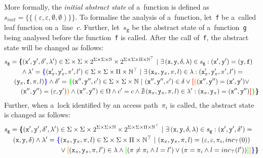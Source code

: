 More formally, the \emph{initial abstract state} of a~function is defined as $ s_{init} = \{\{(\varepsilon, \varepsilon, \emptyset, \emptyset)\}\} $. To formalise the analysis of a~function, let~\texttt{f} be a~called leaf function on a~line~$ c $. Further, let~$ s_\mathtt{g} $ be the abstract state of a~function~\texttt{g} being analysed before the function~\texttt{f} is called. After the call of~\texttt{f}, the abstract state will be changed as follows:
$$
\begin{multlined}
    s_\mathtt{g} = \bb{\{}(\mathtt{x}^\prime, \mathtt{y}^\prime, \delta^\prime, \lambda^\prime) \in \Sigma \times \Sigma \times 2^{\Sigma \times \Sigma \times \mathbb{N}} \times 2^{\Sigma \times \Sigma \times \Pi \times \mathbb{N}^\top}\ | \ \exists\,(\mathtt{x}, \mathtt{y}, \delta, \lambda) \in s_\mathtt{g} : (\mathtt{x}^\prime, \mathtt{y}^\prime) = (\mathtt{y}, \mathtt{f}) \\
%
    \wedge \lambda^\prime = \bA{\{}(\mathtt{x}_\pi^\prime, \mathtt{y}_\pi^\prime, \pi^\prime, l^\prime) \in \Sigma \times \Sigma \times \Pi \times \mathbb{N}^\top\  |\ \exists\,(\mathtt{x}_\pi, \mathtt{y}_\pi, \pi, l) \in \lambda : (\mathtt{x}_\pi^\prime, \mathtt{y}_\pi^\prime, \pi^\prime, l^\prime) = \\
%
    (\mathtt{y}_\pi, \mathtt{f}, \pi, l)\bA{\}} \wedge \delta^\prime = \bD{\{}(\mathtt{x}^{\prime\prime}, \mathtt{y}^{\prime\prime}, c^\prime) \in \Sigma \times \Sigma \times \mathbb{N}\ |\ (\mathtt{x}^{\prime\prime}, \mathtt{y}^{\prime\prime}, c^\prime) \in \delta \vee \bC{[}\bB{(}(\mathtt{x}^{\prime\prime}, \mathtt{y}^{\prime\prime}) = (\mathtt{x}^\prime, \mathtt{y}^\prime) \vee \\
%
    (\mathtt{x}^{\prime\prime}, \mathtt{y}^{\prime\prime}) = (\varepsilon, \mathtt{y}^\prime)\bB{)} \wedge (\mathtt{x}^{\prime\prime}, \mathtt{y}^{\prime\prime}) \in \Omega \wedge c^\prime = c \wedge \nexists\,(\mathtt{x}_\pi, \mathtt{y}_\pi, \pi, l) \in \lambda^\prime : (\mathtt{x}_\pi, \mathtt{y}_\pi) = (\mathtt{x}^{\prime\prime}, \mathtt{y}^{\prime\prime})%
%
    \bC{]}\bD{\}}\bb{\}}
\end{multlined}
$$
Further, when a~lock identified by an access path~$ \pi_i $ is called, the abstract state is changed as follows: 
$$
\begin{multlined}
    s_\mathtt{g} = \bb{\{}(\mathtt{x}^\prime, \mathtt{y}^\prime, \delta^\prime, \lambda^\prime) \in \Sigma \times \Sigma \times 2^{\Sigma \times \Sigma \times \mathbb{N}} \times 2^{\Sigma \times \Sigma \times \Pi \times \mathbb{N}^\top}\ |\ \exists\,(\mathtt{x}, \mathtt{y}, \delta, \lambda) \in s_\mathtt{g} : (\mathtt{x}^\prime, \mathtt{y}^\prime, \delta^\prime) = \\
%
    (\mathtt{x}, \mathtt{y}, \delta) \wedge \lambda^\prime = \bA{\{}(\mathtt{x}_\pi, \mathtt{y}_\pi, \pi, l) \in \Sigma \times \Sigma \times \Pi \times \mathbb{N}^\top\ |\ (\mathtt{x}_\pi, \mathtt{y}_\pi, \pi, l) = (\varepsilon, \varepsilon, \pi_i, inc_\top(0)) \\
%
    \vee \bB{[}(\mathtt{x}_\pi, \mathtt{y}_\pi, \pi, l^\prime) \in \lambda \wedge \bD{[}(\pi \neq \pi_i \wedge l = l^\prime) \vee (\pi = \pi_i \wedge l = inc_\top(l^\prime))
%
    \bD{]}\bB{]}\bA{\}}\bb{\}}
\end{multlined}
$$
